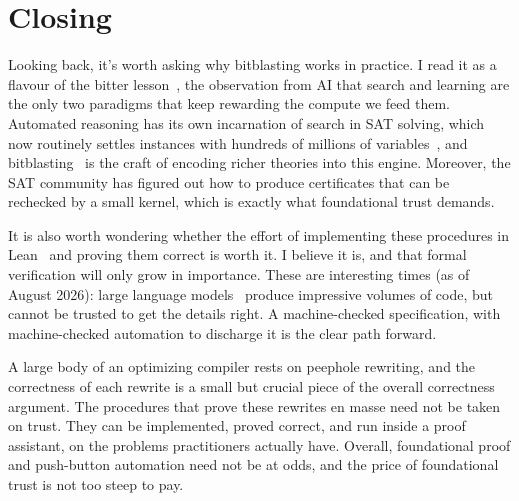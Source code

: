 \section*{Closing}

Looking back, it's worth asking why bitblasting works in practice.
I read it as a flavour of the bitter lesson~\citep{sutton2019bitter},
the observation from AI that search and learning are the only two paradigms that keep rewarding the compute we feed them.
Automated reasoning has its own incarnation of search in SAT solving,
which now routinely settles instances with hundreds of millions of variables~\citep{biere2024cadical,kissatSATComp2024},
and bitblasting~\citep{tseitin1983complexity} is the craft of encoding richer theories into this engine.
Moreover, the SAT community has figured out how to produce certificates that can be rechecked by a small kernel,
which is exactly what foundational trust demands.

It is also worth wondering whether the effort of implementing these procedures in Lean~\citep{demoura2021lean}
and proving them correct is worth it. I believe it is, and that formal verification will only grow in importance.
These are interesting times (as of August 2026): large language models~\citep{brown2020language,touvron2023llama}
produce impressive volumes of code, but cannot be trusted to get the details right.
A machine-checked specification, with machine-checked automation to discharge it is the clear path forward.

A large body of an optimizing compiler rests on peephole rewriting,
and the correctness of each rewrite is a small but crucial piece of the overall correctness argument.
The procedures that prove these rewrites en masse need not be taken on trust.
They can be implemented, proved correct, and run inside a proof assistant,
on the problems practitioners actually have.
Overall, foundational proof and push-button automation need not be at odds,
and the price of foundational trust is not too steep to pay.
